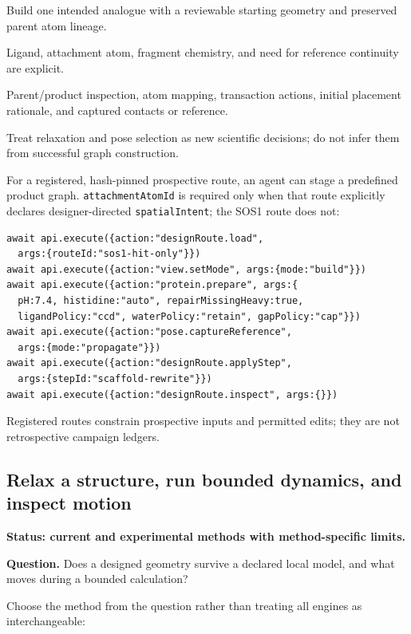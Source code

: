 \begin{small}
\begin{description}[leftmargin=2.2cm,style=nextline]
\item[Goal] Build one intended analogue with a reviewable starting geometry and preserved parent atom lineage.
\item[Preconditions] Ligand, attachment atom, fragment chemistry, and need for reference continuity are explicit.
\item[Evidence] Parent/product inspection, atom mapping, transaction actions, initial placement rationale, and captured contacts or reference.
\item[Stop] Treat relaxation and pose selection as new scientific decisions; do not infer them from successful graph construction.
\end{description}

For a registered, hash-pinned prospective route, an agent can stage a predefined product graph. \texttt{attachmentAtomId} is required only when that route explicitly declares designer-directed \texttt{spatialIntent}; the SOS1 route does not:

\begin{lstlisting}
await api.execute({action:"designRoute.load",
  args:{routeId:"sos1-hit-only"}})
await api.execute({action:"view.setMode", args:{mode:"build"}})
await api.execute({action:"protein.prepare", args:{
  pH:7.4, histidine:"auto", repairMissingHeavy:true,
  ligandPolicy:"ccd", waterPolicy:"retain", gapPolicy:"cap"}})
await api.execute({action:"pose.captureReference",
  args:{mode:"propagate"}})
await api.execute({action:"designRoute.applyStep",
  args:{stepId:"scaffold-rewrite"}})
await api.execute({action:"designRoute.inspect", args:{}})
\end{lstlisting}

Registered routes constrain prospective inputs and permitted edits; they are not retrospective campaign ledgers.

\subsection{Relax a structure, run bounded dynamics, and inspect motion}\label{appB:simulate}

\textbf{Status: current and experimental methods with method-specific limits.}

\textbf{Question.} Does a designed geometry survive a declared local model, and what moves during a bounded calculation?

Choose the method from the question rather than treating all engines as interchangeable:


\end{small}
